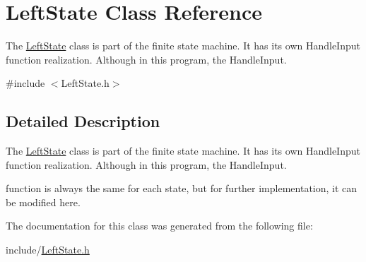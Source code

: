 \hypertarget{class_left_state}{}\section{Left\+State Class Reference}
\label{class_left_state}


The \mbox{\hyperlink{class_left_state}{Left\+State}} class is part of the finite state machine. It has its own Handle\+Input function realization. Although in this program, the Handle\+Input.  




{\ttfamily \#include $<$Left\+State.\+h$>$}



\subsection{Detailed Description}
The \mbox{\hyperlink{class_left_state}{Left\+State}} class is part of the finite state machine. It has its own Handle\+Input function realization. Although in this program, the Handle\+Input. 

function is always the same for each state, but for further implementation, it can be modified here. 

The documentation for this class was generated from the following file\+:\begin{DoxyCompactItemize}
\item 
include/\mbox{\hyperlink{_left_state_8h}{Left\+State.\+h}}\end{DoxyCompactItemize}
